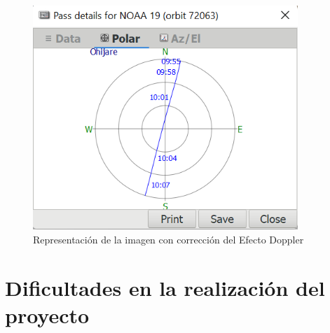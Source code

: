 \documentclass[a4paper,openright,12pt]{article}
\begin{document}
  \begin{figure}[hbtp]
 \centering
 \includegraphics[width = 10cm]{imagenes/noaa_19 pass 31_01.png}
 \caption{Representación de la imagen con corrección del Efecto Doppler}
 \label{apt_corrected}
 \end{figure}
 
 
 

 

\section{Dificultades en la realización del proyecto}
\end{document}
